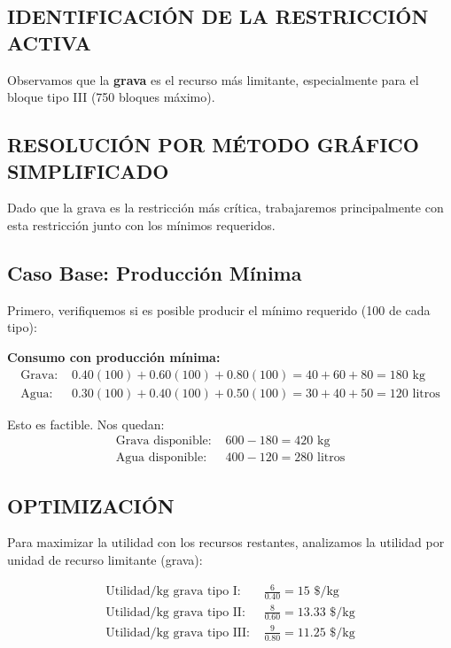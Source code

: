 \documentclass[12pt, a4paper, oneside]{book}
\theoremstyle{definition}
\begin{document}
\subsection{IDENTIFICACIÓN DE LA RESTRICCIÓN ACTIVA}

Observamos que la \textbf{grava} es el recurso más limitante, especialmente para el bloque tipo III (750 bloques máximo).

\subsection{RESOLUCIÓN POR MÉTODO GRÁFICO SIMPLIFICADO}

Dado que la grava es la restricción más crítica, trabajaremos principalmente con esta restricción junto con los mínimos requeridos.

\subsection{Caso Base: Producción Mínima}

Primero, verifiquemos si es posible producir el mínimo requerido (100 de cada tipo):

\textbf{Consumo con producción mínima:}
\begin{align}
\text{Grava: } &0.40(100) + 0.60(100) + 0.80(100) = 40 + 60 + 80 = 180 \text{ kg} \\
\text{Agua: } &0.30(100) + 0.40(100) + 0.50(100) = 30 + 40 + 50 = 120 \text{ litros}
\end{align}

Esto es factible. Nos quedan:
\begin{align}
\text{Grava disponible: } &600 - 180 = 420 \text{ kg} \\
\text{Agua disponible: } &400 - 120 = 280 \text{ litros}
\end{align}

\subsection{OPTIMIZACIÓN}

Para maximizar la utilidad con los recursos restantes, analizamos la utilidad por unidad de recurso limitante (grava):

\begin{align}
\text{Utilidad/kg grava tipo I: } &\frac{6}{0.40} = 15 \text{ \$/kg} \\
\text{Utilidad/kg grava tipo II: } &\frac{8}{0.60} = 13.33 \text{ \$/kg} \\
\text{Utilidad/kg grava tipo III: } &\frac{9}{0.80} = 11.25 \text{ \$/kg}
\end{align}
\end{document}
